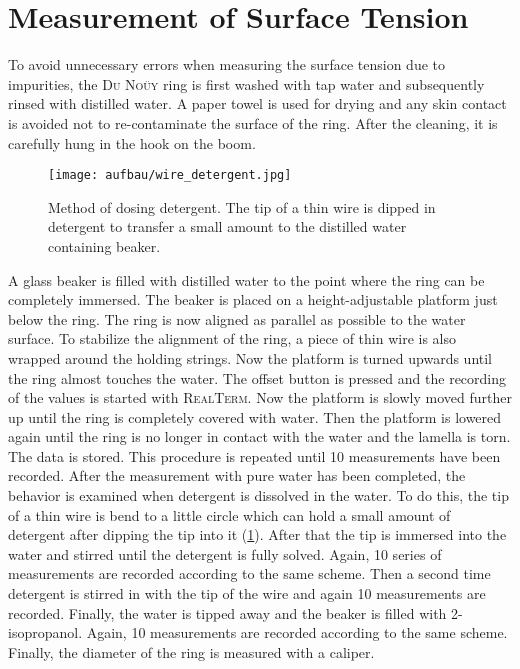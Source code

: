     \section{Measurement of Surface Tension} \label{sec:Surface_Tension}
        To avoid unnecessary errors when measuring the surface tension due to impurities, the \textsc{Du Noüy} ring is first washed with tap
        water and subsequently rinsed with distilled water. A paper towel is used for drying and any skin contact is avoided
        not to re-contaminate the surface of the ring. After the cleaning, it is carefully hung in the hook on the boom.\par
        \begin{figure}[h]
		    \centering
		    \texttt{[image: aufbau/wire\_detergent.jpg]}
		    \caption[Method of dosing detergent]{Method of dosing detergent. The tip of a thin wire is dipped in detergent to transfer a small amount to the distilled water containing beaker.}
		    \label{fig:wire_detergent}
	    \end{figure}
        A glass beaker is filled with distilled water to the point where the ring can be
        completely immersed. The beaker is placed on a height-adjustable platform just below the ring. The ring is now aligned as
        parallel as possible to the water surface. To stabilize the alignment of the ring, a piece of thin wire is also wrapped
        around the holding strings. Now the platform is turned upwards until the ring almost touches the water. The offset button
        is pressed and the recording of the values is started with \textsc{RealTerm}. Now the platform is slowly moved further up
        until the ring is completely covered with water. Then the platform is lowered again until the ring is no longer in contact
        with the water and the lamella is torn. The data is stored. This procedure is repeated until 10 measurements have been
        recorded. After the measurement with pure water has been completed, the behavior is examined when detergent is dissolved
        in the water. To do this, the tip of a thin wire is bend to a little circle which can hold a small amount of detergent
        after dipping the tip into it (\cref{fig:wire_detergent}). After that the tip is immersed into the water and stirred until the detergent is fully
        solved. Again, 10 series of measurements are recorded according to the same scheme. Then a second time detergent is stirred
        in with the tip of the wire and again 10 measurements are recorded. Finally, the water is tipped away and the beaker is
        filled with 2-isopropanol. Again, 10 measurements are recorded according to the same scheme. Finally, the diameter of the
        ring is measured with a caliper.
